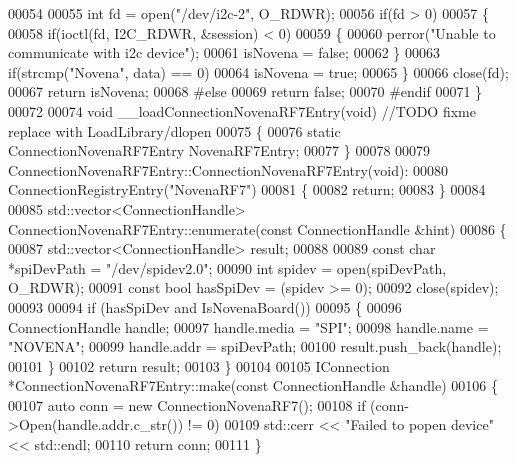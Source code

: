 \begin{DoxyCode}
00054 
00055     \textcolor{keywordtype}{int} fd = open(\textcolor{stringliteral}{"/dev/i2c-2"}, O\_RDWR);
00056     \textcolor{keywordflow}{if}(fd > 0)
00057     \{
00058         \textcolor{keywordflow}{if}(ioctl(fd, I2C\_RDWR, &session) < 0)
00059         \{
00060             perror(\textcolor{stringliteral}{"Unable to communicate with i2c device"});
00061             isNovena = \textcolor{keyword}{false};
00062         \}
00063         \textcolor{keywordflow}{if}(strcmp(\textcolor{stringliteral}{"Novena"}, data) == 0)
00064             isNovena = \textcolor{keyword}{true};
00065     \}
00066     close(fd);
00067     \textcolor{keywordflow}{return} isNovena;
00068 \textcolor{preprocessor}{#else}
00069     \textcolor{keywordflow}{return} \textcolor{keyword}{false};
00070 \textcolor{preprocessor}{#endif}
00071 \}
00072 
00074 \textcolor{keywordtype}{void} __loadConnectionNovenaRF7Entry(\textcolor{keywordtype}{void}) \textcolor{comment}{//TODO fixme replace with LoadLibrary/dlopen}
00075 \{
00076 \textcolor{keyword}{static} ConnectionNovenaRF7Entry NovenaRF7Entry;
00077 \}
00078 
00079 ConnectionNovenaRF7Entry::ConnectionNovenaRF7Entry(\textcolor{keywordtype}{void}):
00080     ConnectionRegistryEntry(\textcolor{stringliteral}{"NovenaRF7"})
00081 \{
00082     \textcolor{keywordflow}{return};
00083 \}
00084 
00085 std::vector<ConnectionHandle> ConnectionNovenaRF7Entry::enumerate(\textcolor{keyword}{const} 
      ConnectionHandle &hint)
00086 \{
00087     std::vector<ConnectionHandle> result;
00088 
00089     \textcolor{keyword}{const} \textcolor{keywordtype}{char} *spiDevPath = \textcolor{stringliteral}{"/dev/spidev2.0"};
00090     \textcolor{keywordtype}{int} spidev = open(spiDevPath, O\_RDWR);
00091     \textcolor{keyword}{const} \textcolor{keywordtype}{bool} hasSpiDev = (spidev >= 0);
00092     close(spidev);
00093 
00094     \textcolor{keywordflow}{if} (hasSpiDev and IsNovenaBoard())
00095     \{
00096         ConnectionHandle handle;
00097         handle.media = \textcolor{stringliteral}{"SPI"};
00098         handle.name = \textcolor{stringliteral}{"NOVENA"};
00099         handle.addr = spiDevPath;
00100         result.push\_back(handle);
00101     \}
00102     \textcolor{keywordflow}{return} result;
00103 \}
00104 
00105 IConnection *ConnectionNovenaRF7Entry::make(\textcolor{keyword}{const} ConnectionHandle &handle)
00106 \{
00107     \textcolor{keyword}{auto} conn = \textcolor{keyword}{new} ConnectionNovenaRF7();
00108     \textcolor{keywordflow}{if} (conn->Open(handle.addr.c\_str()) != 0)
00109         std::cerr << \textcolor{stringliteral}{"Failed to popen device"} << std::endl;
00110     \textcolor{keywordflow}{return} conn;
00111 \}
\end{DoxyCode}
